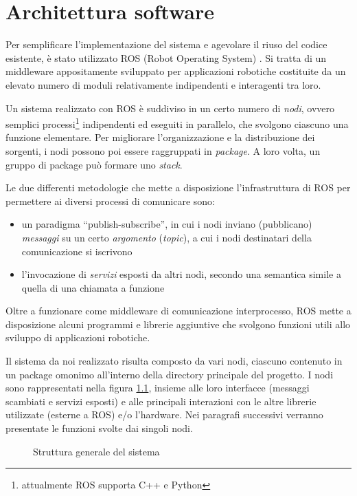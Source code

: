 \chapter{Architettura software}
\label{cap:architetturasw}

Per semplificare l'implementazione del sistema e agevolare il riuso del codice esistente, è stato utilizzato ROS (Robot Operating System) \cite{rosweb}. Si tratta di un middleware appositamente sviluppato per applicazioni robotiche costituite da un elevato numero di moduli relativamente indipendenti e interagenti tra loro.

Un sistema realizzato con ROS è suddiviso in un certo numero di \emph{nodi}, ovvero semplici processi\footnote{attualmente ROS supporta C++ e Python} indipendenti ed eseguiti in parallelo, che svolgono ciascuno una funzione elementare. Per migliorare l'organizzazione e la distribuzione dei sorgenti, i nodi possono poi essere raggruppati in \emph{package}. A loro volta, un gruppo di package può formare uno \emph{stack}.

Le due differenti metodologie che mette a disposizione l'infrastruttura di ROS per permettere ai diversi processi di comunicare sono:
\begin{itemize}
 \item un paradigma ``publish-subscribe'', in cui i nodi inviano (pubblicano) \emph{messaggi} su un certo \emph{argomento} (\emph{topic}), a cui i nodi destinatari della comunicazione si iscrivono
 \item l'invocazione di \emph{servizi} esposti da altri nodi, secondo una semantica simile a quella di una chiamata a funzione
\end{itemize}

Oltre a funzionare come middleware di comunicazione interprocesso, ROS mette a disposizione alcuni programmi e librerie aggiuntive che svolgono funzioni utili allo sviluppo di applicazioni robotiche.

Il sistema da noi realizzato risulta composto da vari nodi, ciascuno contenuto in un package omonimo all'interno della directory principale del progetto. I nodi sono rappresentati nella figura \ref{fig:schemanodi}, insieme alle loro interfacce (messaggi scambiati e servizi esposti) e alle principali interazioni con le altre librerie utilizzate (esterne a ROS) e/o l'hardware. Nei paragrafi successivi verranno presentate le funzioni svolte dai singoli nodi.

\begin{figure}[h]

\caption{Struttura generale del sistema} 
\label{fig:schemanodi}
\end{figure}

